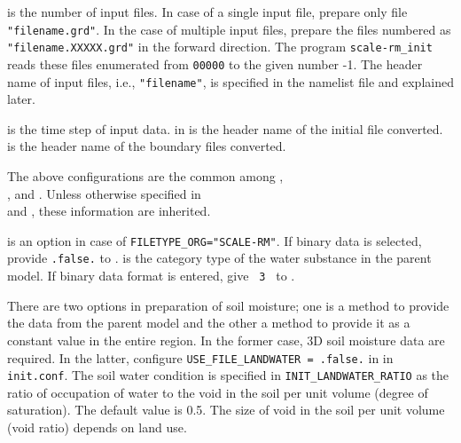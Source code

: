  is the number of input files.
In case of a single input file, prepare only file \verb|"filename.grd"|.
In the case of multiple input files, prepare the files numbered as \verb|"filename.XXXXX.grd"| in the forward direction.
The program \verb|scale-rm_init| reads these files enumerated from \verb|00000| to the given number -1.
The header name of input files, i.e., \verb|"filename"|, is specified in the namelist file and explained later.

 is the time step of input data.
 in  is the header name of the initial file converted.
 is the header name of the boundary files converted.

The above configurations are the common among ,\\ , and . Unless otherwise specified in\\
 and , these information are inherited.


 is an option in case of \verb|FILETYPE_ORG="SCALE-RM"|.
If binary data is selected, provide \verb|.false.| to .
 is the category type of the water substance in the parent model.
If binary data format is entered, give \verb| 3 | to .

There are two options in preparation of soil moisture; one is a method to provide the data from the parent model and the other a method to provide it as a constant value in the entire region.
In the former case, 3D soil moisture data are required. In the latter, configure \verb|USE_FILE_LANDWATER = .false.| in  in \verb|init.conf|.
The soil water condition is specified in \verb|INIT_LANDWATER_RATIO| as the ratio of occupation of water to the void in the soil per unit volume (degree of saturation). The default value is 0.5. The size of void in the soil per unit volume (void ratio) depends on land use.


